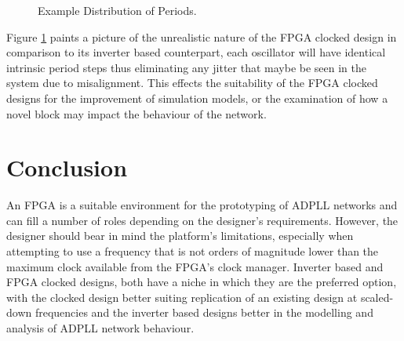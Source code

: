 \documentclass[conference]{IEEEtran}
\begin{document}
\begin{figure}[h]%
    \centering
    \caption{Example Distribution of Periods.\label{fig:dists}}    
    \vspace{-0.5cm}
\end{figure}
Figure \ref{fig:dists} paints a picture of the unrealistic nature of the FPGA clocked design in comparison to its inverter based counterpart, each oscillator will have identical intrinsic period steps thus eliminating any jitter that maybe be seen in the system due to misalignment. This effects the suitability of the FPGA clocked designs for the improvement of simulation models, or the examination of how a novel block may impact the behaviour of the network.
\section*{Conclusion}
An FPGA is a suitable environment for the prototyping of ADPLL networks and can fill a number of roles depending on the designer's requirements. However, the designer should bear in mind the platform's limitations, especially when attempting to use a frequency that is not orders of magnitude lower than the maximum clock available from the FPGA's clock manager. Inverter based and FPGA clocked designs, both have a niche in which they are the preferred option, with the clocked design better suiting replication of an existing design at scaled-down frequencies and the inverter based designs better in the modelling and analysis of ADPLL network behaviour.


 
\end{document}
